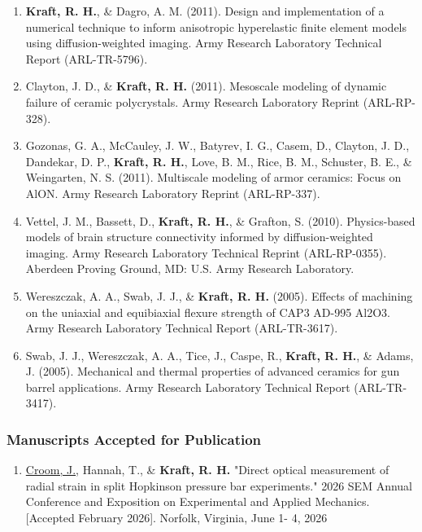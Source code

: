 \documentclass[a4paper,10pt]{article}
\begin{document}
\begin{enumerate}
\item \textbf{\textbf{Kraft,} R. H.}, \& Dagro, A. M. (2011). Design and implementation of a numerical technique to inform anisotropic hyperelastic finite element models using diffusion-weighted imaging. Army Research Laboratory Technical Report (ARL-TR-5796).
\item Clayton, J. D., \& \textbf{\textbf{Kraft,} R. H.} (2011). Mesoscale modeling of dynamic failure of ceramic polycrystals. Army Research Laboratory Reprint (ARL-RP-328).
\item Gozonas, G. A., McCauley, J. W., Batyrev, I. G., Casem, D., Clayton, J. D., Dandekar, D. P., \textbf{\textbf{Kraft,} R. H.}, Love, B. M., Rice, B. M., Schuster, B. E., \& Weingarten, N. S. (2011). Multiscale modeling of armor ceramics: Focus on AlON. Army Research Laboratory Reprint (ARL-RP-337).
\item Vettel, J. M., Bassett, D., \textbf{\textbf{Kraft,} R. H.}, \& Grafton, S. (2010). Physics-based models of brain structure connectivity informed by diffusion-weighted imaging. Army Research Laboratory Technical Reprint (ARL-RP-0355). Aberdeen Proving Ground, MD: U.S. Army Research Laboratory.
\item Wereszczak, A. A., Swab, J. J., \& \textbf{\textbf{Kraft,} R. H.} (2005). Effects of machining on the uniaxial and equibiaxial flexure strength of CAP3 AD-995 Al2O3. Army Research Laboratory Technical Report (ARL-TR-3617).
\item Swab, J. J., Wereszczak, A. A., Tice, J., Caspe, R., \textbf{\textbf{Kraft,} R. H.}, \& Adams, J. (2005). Mechanical and thermal properties of advanced ceramics for gun barrel applications. Army Research Laboratory Technical Report (ARL-TR-3417).
\end{enumerate}

\subsubsection*{Manuscripts Accepted for Publication}
\begin{enumerate}
\item \underline{Croom, J.}, Hannah, T., \& \textbf{\textbf{Kraft,} R. H.} "Direct optical measurement of radial strain in split Hopkinson pressure bar experiments." 2026 SEM Annual Conference and Exposition on Experimental and Applied Mechanics. [Accepted February 2026]. Norfolk, Virginia, June 1- 4, 2026
\end{enumerate}
\end{document}
